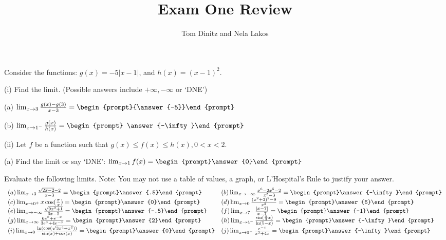 \documentclass{ximera}
\author{Tom Dinitz and Nela Lakos}
\title{Exam One Review}
\begin{document}
\begin{exercise}
Consider the functions: $g(x)=-5|x-1|$, and $h(x)=(x-1)^2$.

(i) Find the limit. (Possible answers include $+\infty, -\infty$ or `DNE')

(a) $\lim_{x\to 3} \frac{g(x)-g(3)}{x-3}=\begin{prompt}{\answer{-5}}\end{prompt}$

(b) $\lim_{x\to 1^-} \frac{g(x)}{h(x)}=\begin{prompt} \answer{-\infty}\end{prompt}$

(ii) Let $f$ be a function such that $g(x)\leq f(x)\leq h(x), 0<x<2$.

(a) Find the limit or say `DNE': $\lim_{x\to 1} f(x)= \begin{prompt}\answer{0}\end{prompt}$
\end{exercise}

\begin{exercise}
  Evaluate the following limits. Note: You may not use a table of values, a graph,
  or L'Hospital's Rule to justify your answer.
\[
\begin{array}{l l}
  (a) \lim_{x\to 3} \frac{\sqrt{2x-2}-2}{x-3}=\begin{prompt}\answer{.5}\end{prompt}
	&
  (b) \lim_{x\to -\infty} \frac{x^6-2x^5-2}{x^5-3}=\begin{prompt}\answer{-\infty}\end{prompt} \\
  (c) \lim_{x\to 0^+} x\cos(\frac{\pi}{x})=\begin{prompt}\answer{0}\end{prompt} &
  (d) \lim_{x\to 0} \frac{(x^2+3)^2-9}{x^2}=\begin{prompt}\answer{6}\end{prompt}\\
  (e) \lim_{x\to -\infty} \frac{\sqrt{9x^2+1}}{6x-5}=\begin{prompt}\answer{-.5}\end{prompt} &
  (f) \lim_{x\to 7^-} \frac{|x-7|}{x-7}=\begin{prompt}\answer{-1}\end{prompt}\\
  (g) \lim_{x\to \infty} \frac{6e^x+e^{-x}}{3e^x+4e^{-x}}=\begin{prompt}\answer{2}\end{prompt}&
  (h) \lim_{x\to 4^-} \frac{\sin(\frac{\pi}{3}x)}{\ln(5-x)}=\begin{prompt}\answer{-\infty}\end{prompt}\\
  (i) \lim_{x\to 0} \frac{\ln(\cos(\sqrt{3x^4+x^2}))}{\sin(x)+\cos(x)}=\begin{prompt}\answer{0}\end{prompt}
&
  (j) \lim_{x\to 0^-} \frac{e^{-x}}{x^2+4x}=\begin{prompt}\answer{-\infty}\end{prompt}
\end{array}
\]
\end{exercise}
\end{document}
